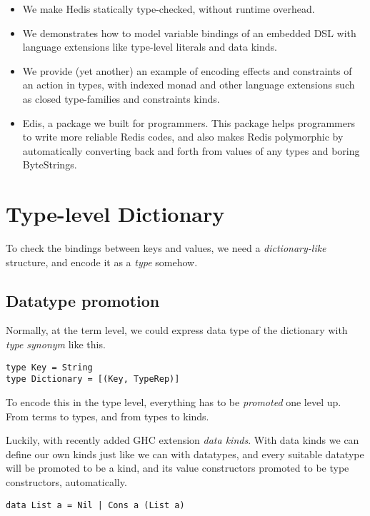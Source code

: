\documentclass[pldi]{sigplanconf-pldi16}
\begin{document}
\begin{itemize}[noitemsep]
\item We make Hedis statically type-checked, without runtime overhead.
\item We demonstrates how to model variable bindings of an embedded DSL with
language extensions like type-level literals and data kinds.
\item We provide (yet another) an example of encoding effects and
 constraints of an action in types, with indexed monad\cite{indexedmonad}
  and other language extensions such as closed
  type-families\cite{closedtypefamilies} and constraints
  kinds\cite{constraintskinds}.
\item Edis, a package we built for programmers. This package helps programmers
 to write more reliable Redis codes, and also makes Redis polymorphic by
 automatically converting back and forth from values of any types and boring
 ByteStrings.
\end{itemize}

\section{Type-level Dictionary}

To check the bindings between keys and values, we need a \emph{dictionary-like}
structure, and encode it as a \emph{type} somehow.

\subsection{Datatype promotion}
Normally, at the term level, we could express data type of the dictionary with
\emph{type synonym} like this.

\begin{verbatim}
type Key = String
type Dictionary = [(Key, TypeRep)]
\end{verbatim}

To encode this in the type level, everything has to be
\emph{promoted}\cite{promotion} one level up.
From terms to types, and from types to kinds.

Luckily, with recently added GHC extension \emph{data kinds}. With data kinds
we can define our own kinds just like we can with datatypes, and every suitable
datatype will be promoted to be a kind, and its value constructors promoted
to be type constructors, automatically.

\begin{verbatim}
data List a = Nil | Cons a (List a)
\end{verbatim}
\end{document}
